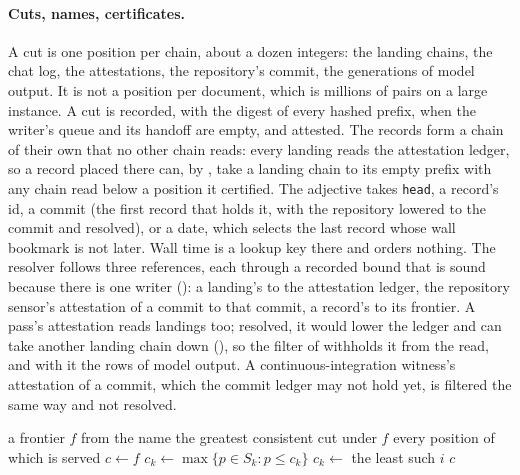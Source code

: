 \documentclass[11pt]{article}
\theoremstyle{plain}
\theoremstyle{definition}
\newcommand{\lean}[1]{\path{#1}}
\begin{document}
\paragraph{Cuts, names, certificates.}
A cut is one position per chain, about a dozen integers: the landing chains, the chat log, the
attestations, the repository's commit, the generations of model output. It is not a position per
document, which is millions of pairs on a large instance. A cut is recorded, with the digest of every
hashed prefix, when the writer's queue and its handoff are empty, and attested. The records form
a chain of their own that no other chain reads: every landing reads the attestation ledger, so
a record placed there can, by , take a landing chain to its empty prefix with
any chain read below a position it certified. The adjective takes \texttt{head}, a record's id, a commit
(the first record that holds it, with the repository lowered to the commit and resolved), or a
date, which selects the last record whose wall bookmark is not later. Wall time is a lookup key
there and orders nothing. The resolver follows three references, each through a recorded bound
that is sound because there is one writer (): a landing's to the attestation
ledger, the repository sensor's attestation of a commit to that commit, a record's to its
frontier. A pass's attestation reads landings too; resolved, it would lower the ledger and can
take another landing chain down (\lean{Witness.pass_drags}), so the filter of 
withholds it from the read, and with it the rows of model output. A continuous-integration
witness's attestation of a commit, which the commit ledger may not hold yet, is filtered the same
way and not resolved.

\begin{algorithm}[t]
\caption{The cut a read under \texttt{as of} is taken at. $S_k$: the positions chain $k$ serves.
$\beta_k(i)$: for the $i$-th event of chain $k$, the bounds recorded at its writing for its
resolved references only; they rise with $i$.}\label{alg:resolve}
\begin{algorithmic}[1]
\Require a frontier $f$ from the name
\Ensure the greatest consistent cut under $f$ every position of which is served
\State $c \gets f$
\Repeat
    \State $c_k \gets \max\{p \in S_k : p \le c_k\}$ 
      \State $c_k \gets$ the least such $i$ 
    \EndIf
  \EndFor
{}
\State \Return $c$
\end{algorithmic}
\end{algorithm}
\end{document}
